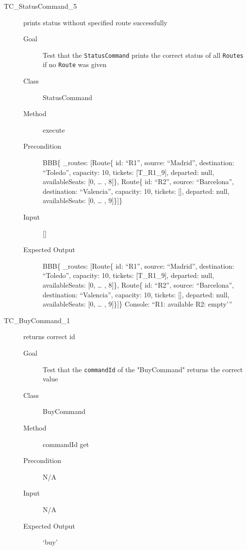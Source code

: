 \documentclass[11pt]{article}
\begin{document}
\begin{description}
\item[{TC\_StatusCommand\_5}] prints status without specified route successfully
\begin{description}
\item[{Goal}] Test that the \texttt{StatusCommand} prints the correct status of all \texttt{Routes} if no \texttt{Route} was given
\item[{Class}] StatusCommand
\item[{Method}] execute
\item[{Precondition}] BBB\{ \_routes: [Route\{ id: “R1”, source: “Madrid”, destination: “Toledo”, capacity: 10,  tickets: [T\_R1\_9], departed: null, availableSeats: [0, … , 8]\}, Route\{ id: “R2”, source: “Barcelona”, destination: “Valencia”, capacity: 10,  tickets: [], departed: null, availableSeats: [0, … , 9]\}]\}
\item[{Input}] []
\item[{Expected Output}] BBB\{ \_routes: [Route\{ id: “R1”, source: “Madrid”, destination: “Toledo”, capacity: 10,  tickets: [T\_R1\_9], departed: null, availableSeats: [0, … , 8]\}, Route\{ id: “R2”, source: “Barcelona”, destination: “Valencia”, capacity: 10,  tickets: [], departed: null, availableSeats: [0, … , 9]\}]\}
Console: “R1: available
          R2: empty’”
\end{description}

\item[{TC\_BuyCommand\_1}] returns correct id
\begin{description}
\item[{Goal}] Test that the \texttt{commandId} of the "BuyCommand" returns the correct value
\item[{Class}] BuyCommand
\item[{Method}] commandId get
\item[{Precondition}] N/A
\item[{Input}] N/A
\item[{Expected Output}] ‘buy’
\end{description}
\end{description}
\end{document}
